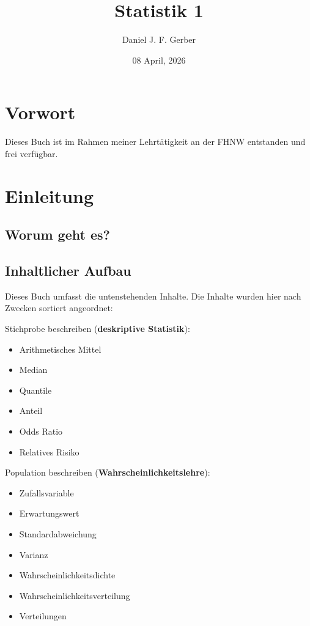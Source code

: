 \documentclass[
]{book}
\title{Statistik 1}
\author{Daniel J. F. Gerber}
\date{08 April, 2026}
\providecommand{\tightlist}{%
  \setlength{\itemsep}{0pt}\setlength{\parskip}{0pt}}
\theoremstyle{definition}
\theoremstyle{definition}
\theoremstyle{definition}
\theoremstyle{definition}
\theoremstyle{remark}
\begin{document}
\maketitle

{
\setcounter{tocdepth}{1}
\tableofcontents
}
\chapter*{Vorwort}\label{vorwort}

Dieses Buch ist im Rahmen meiner Lehrtätigkeit an der FHNW entstanden und frei verfügbar.

\chapter{Einleitung}\label{einleitung}

\section{Worum geht es?}\label{worum-geht-es}

\section{Inhaltlicher Aufbau}\label{inhaltlicher-aufbau}

Dieses Buch umfasst die untenstehenden Inhalte. Die Inhalte wurden hier nach Zwecken sortiert angeordnet:

Stichprobe beschreiben (\textbf{deskriptive Statistik}):

\begin{itemize}
\tightlist
\item
  Arithmetisches Mittel
\item
  Median
\item
  Quantile
\item
  Anteil
\item
  Odds Ratio
\item
  Relatives Risiko
\end{itemize}

Population beschreiben (\textbf{Wahrscheinlichkeitslehre}):

\begin{itemize}
\tightlist
\item
  Zufallsvariable
\item
  Erwartungswert
\item
  Standardabweichung
\item
  Varianz
\item
  Wahrscheinlichkeitsdichte
\item
  Wahrscheinlichkeitsverteilung
\item
  Verteilungen
\end{itemize}
\end{document}
